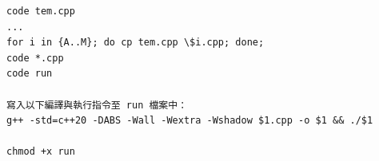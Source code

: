 \begin{lstlisting}
code tem.cpp
...
for i in {A..M}; do cp tem.cpp \$i.cpp; done;
code *.cpp
code run

寫入以下編譯與執行指令至 run 檔案中：
g++ -std=c++20 -DABS -Wall -Wextra -Wshadow $1.cpp -o $1 && ./$1

chmod +x run
\end{lstlisting}